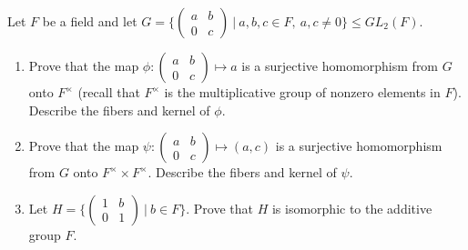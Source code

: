 \begin{exercise}
    Let $F$ be a field and let $G = \{\begin{pmatrix} a & b \\ 0 & c \end{pmatrix} \ | \ a,b,c \in F, \ a,c \neq 0\} \leq GL_2(F)$.
    \begin{enumerate}[label = \textbf{(\alph*)}]
        \item Prove that the map $\phi : \begin{pmatrix} a & b \\ 0 & c \end{pmatrix} \mapsto a$ is a surjective homomorphism from $G$ onto $F^{\times}$ (recall that $F^{\times}$ is the multiplicative group of nonzero elements in $F$). Describe the fibers and kernel of $\phi$.
        \item Prove that the map $\psi : \begin{pmatrix} a & b \\ 0 & c \end{pmatrix} \mapsto (a,c)$ is a surjective homomorphism from $G$ onto $F^{\times}\times F^{\times}$. Describe the fibers and kernel of $\psi$.
        \item Let $H = \{\begin{pmatrix} 1 & b \\ 0 & 1 \end{pmatrix} \ | \ b \in F\}$. Prove that $H$ is isomorphic to the additive group $F$.
    \end{enumerate}
\end{exercise}

